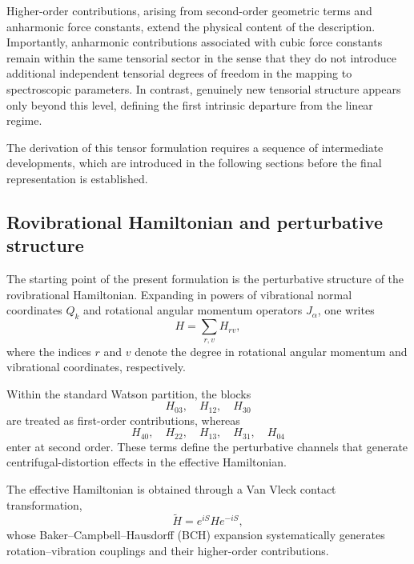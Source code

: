 \documentclass[aip,jcp,reprint,floatfix]{revtex4-2}
\begin{document}
Higher-order contributions, arising from second-order geometric terms
and anharmonic force constants, extend the physical content of the
description. Importantly, anharmonic contributions associated with
cubic force constants remain within the same tensorial sector in the
sense that they do not introduce additional independent tensorial
degrees of freedom in the mapping to spectroscopic parameters. In
contrast, genuinely new tensorial structure appears only beyond this
level, defining the first intrinsic departure from the linear regime.



The derivation of this tensor formulation requires a sequence of
intermediate developments, which are introduced in the following
sections before the final representation is established.


\subsection{Rovibrational Hamiltonian and perturbative structure}

The starting point of the present formulation is the perturbative
structure of the rovibrational Hamiltonian. Expanding in powers of
vibrational normal coordinates $Q_k$ and rotational angular momentum
operators $J_\alpha$, one writes
\begin{equation}
H = \sum_{r,v} H_{rv},
\end{equation}
where the indices $r$ and $v$ denote the degree in rotational angular
momentum and vibrational coordinates, respectively.

Within the standard Watson partition, the blocks
\begin{equation}
H_{03}, \quad H_{12}, \quad H_{30}
\end{equation}
are treated as first-order contributions, whereas
\begin{equation}
H_{40}, \quad H_{22}, \quad H_{13}, \quad H_{31}, \quad H_{04}
\end{equation}
enter at second order. These terms define the perturbative channels
that generate centrifugal-distortion effects in the effective
Hamiltonian.

The effective Hamiltonian is obtained through a Van Vleck contact
transformation,\cite{VanVleck1932}
\begin{equation}
\tilde{H} = e^{iS} H e^{-iS},
\end{equation}
whose Baker--Campbell--Hausdorff (BCH) expansion\cite{Baker1905,Campbell1897,Hausdorff1906} systematically generates rotation--vibration couplings and their higher-order contributions.
\end{document}
